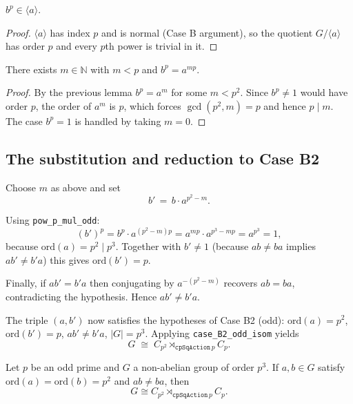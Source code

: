 \begin{lemma}
$b^p \in \langle a \rangle$.
\end{lemma}

\begin{proof}
$\langle a\rangle$ has index $p$ and is normal (Case B argument), so the
quotient $G/\langle a\rangle$ has order $p$ and every $p$th power is trivial
in it.
\end{proof}

\begin{lemma}
There exists $m \in \mathbb{N}$ with $m < p$ and $b^p = a^{m p}$.
\end{lemma}

\begin{proof}
By the previous lemma $b^p = a^m$ for some $m < p^2$. Since $b^p \ne 1$ would
have order $p$, the order of $a^m$ is $p$, which forces $\gcd(p^2, m) = p$ and
hence $p \mid m$. The case $b^p = 1$ is handled by taking $m = 0$.
\end{proof}

\subsection{The substitution and reduction to Case B2}

Choose $m$ as above and set
\[
  b' \,=\, b \cdot a^{p^2 - m}.
\]

Using \texttt{pow\_p\_mul\_odd}:
\[
  (b')^p = b^p \cdot a^{(p^2 - m) p} = a^{mp} \cdot a^{p^3 - mp} = a^{p^3} = 1,
\]
because $\mathrm{ord}(a) = p^2 \mid p^3$. Together with $b' \ne 1$ (because
$a b \ne b a$ implies $a b' \ne b' a$) this gives $\mathrm{ord}(b') = p$.

Finally, if $a b' = b' a$ then conjugating by $a^{-(p^2-m)}$ recovers
$a b = b a$, contradicting the hypothesis. Hence $a b' \ne b' a$.

The triple $(a, b')$ now satisfies the hypotheses of Case B2 (odd):
$\mathrm{ord}(a) = p^2$, $\mathrm{ord}(b') = p$, $a b' \ne b' a$, $|G| = p^3$.
Applying \texttt{case\_B2\_odd\_isom} yields
\[
  G \;\cong\; C_{p^2} \rtimes_{\texttt{cpSqAction}\,p} C_p.
\]

\begin{theorem}
Let $p$ be an odd prime and $G$ a non-abelian group of order $p^3$. If
$a, b \in G$ satisfy $\mathrm{ord}(a) = \mathrm{ord}(b) = p^2$ and
$a b \ne b a$, then
\[
  G \cong C_{p^2} \rtimes_{\texttt{cpSqAction}\,p} C_p.
\]
\end{theorem}


